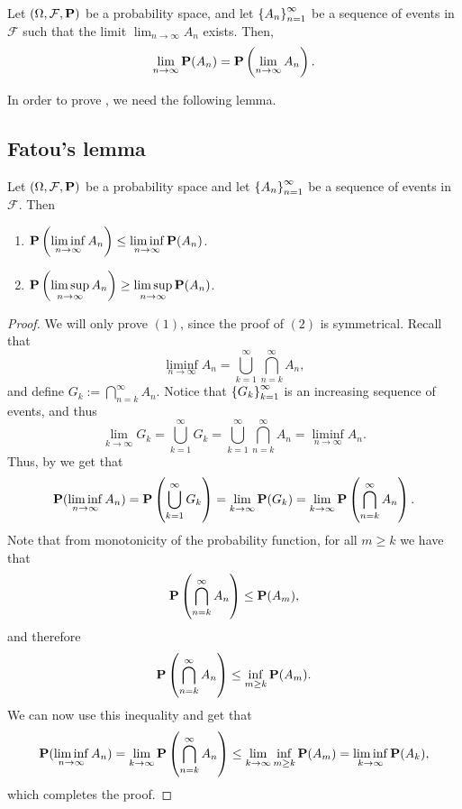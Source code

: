 \documentclass[11pt,a4paper]{article}
\begin{document}
\begin{theorem}
\label{thm:continuity}
  Let $(\Omega, \mathcal F, \mathbf{P})$ be a probability space, and
  let $\left\{A_n\right\}_{n = 1}^{\infty}$ be a sequence of events in $\mathcal F$
  such that the limit $\lim_{n \to \infty} A_n$ exists.
  Then,
  \[
    \lim_{n \to \infty} \mathbf{P}(A_n) =
    \mathbf{P}\left(\lim_{n \to \infty} A_n\right).
  \]
\end{theorem}

\begin{remark}
  In order to prove , we need the following lemma.
\end{remark}

\subsection{Fatou's lemma}
\begin{lemma}\label{lem:fatou}
  Let $(\Omega, \mathcal F, \mathbf{P})$ be a probability space and
  let $\left\{A_n\right\}_{n = 1}^{\infty}$ be a sequence of events in $\mathcal F$.
  Then
  \begin{enumerate}
    \item[(1)] $\mathbf{P}\left(\liminf\limits_{n \to \infty} A_n\right) \le
          \liminf\limits_{n \to \infty} \mathbf{P}(A_n)$.
    \item[(2)] $\mathbf{P}\left(\limsup\limits_{n \to \infty} A_n\right) \geq
          \limsup\limits_{n \to \infty} \mathbf{P}(A_n)$.
  \end{enumerate}
\end{lemma}
\begin{proof}
  We will only prove $(1)$,
  since the proof of $(2)$ is symmetrical.
  Recall that
  \[
    \liminf_{n \to \infty} A_n =
    \bigcup_{k=1}^{\infty} \bigcap_{n=k}^{\infty} A_n,
  \]
  and define $G_k := \bigcap_{n=k}^{\infty} A_n$.
  Notice that $\left\{G_k\right\}_{k=1}^{\infty}$ is an increasing sequence of
  events, and thus
  \[
    \lim_{k \to \infty} G_k =
    \bigcup_{k=1}^{\infty} G_k =
    \bigcup_{k=1}^{\infty} \bigcap_{n=k}^{\infty} A_n =
    \liminf_{n \to \infty} A_n.
  \]
  Thus, by  we get that
  \[
    \mathbf{P}(\liminf_{n \to \infty} A_n) =
    \mathbf{P}\left(\bigcup_{k=1}^{\infty} G_k\right) =
    \lim_{k \to \infty} \mathbf{P}(G_k) =
    \lim_{k \to \infty} \mathbf{P}\left(\bigcap_{n=k}^{\infty} A_n\right).
  \]
  Note that from monotonicity of the probability function,
  for all $m \geq k$ we have that
  \[
    \mathbf{P}\left(\bigcap_{n=k}^{\infty} A_n\right) \le
    \mathbf{P}(A_m),
  \]
  and therefore
  \[
    \mathbf{P}\left(\bigcap_{n=k}^{\infty} A_n\right) \le
    \inf_{m \geq k} \mathbf{P}(A_m).
  \]
  We can now use this inequality and get that
  \[
    \mathbf{P}(\liminf_{n \to \infty} A_n) =
    \lim_{k \to \infty} \mathbf{P}\left(\bigcap_{n=k}^{\infty} A_n\right) \le
    \lim_{k \to \infty} \inf_{m \geq k} \mathbf{P}(A_m) =
    \liminf\limits_{k \to \infty} \mathbf{P}(A_k),
  \]
  which completes the proof.
\end{proof}
\end{document}
